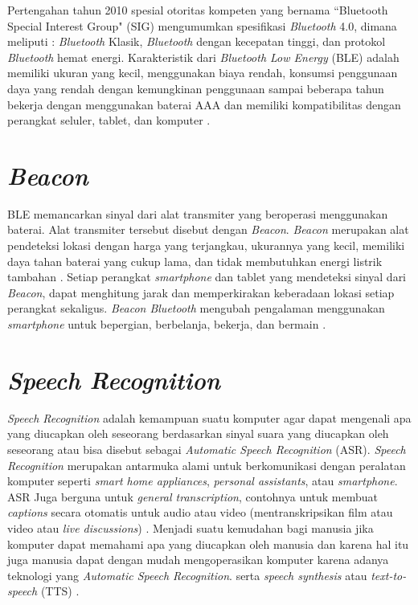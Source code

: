 \par Pertengahan tahun 2010 spesial otoritas kompeten yang bernama “Bluetooth Special Interest Group" (SIG) mengumumkan spesifikasi \textit{Bluetooth} 4.0, dimana meliputi : \textit{Bluetooth} Klasik, \textit{Bluetooth} dengan kecepatan tinggi, dan protokol \textit{Bluetooth} hemat energi. Karakteristik dari \textit{Bluetooth Low Energy} (BLE) adalah memiliki ukuran yang kecil, menggunakan biaya rendah, konsumsi penggunaan daya yang rendah dengan kemungkinan penggunaan sampai beberapa tahun bekerja dengan menggunakan baterai AAA dan memiliki kompatibilitas dengan perangkat seluler, tablet, dan komputer \citep{kaluvza2017analysis}.



\section{\textit{Beacon}}
BLE memancarkan sinyal dari alat transmiter yang beroperasi menggunakan baterai. Alat transmiter tersebut disebut dengan \textit{Beacon}. \textit{Beacon} merupakan alat pendeteksi lokasi dengan harga yang terjangkau, ukurannya yang kecil, memiliki daya tahan baterai yang cukup lama, dan tidak membutuhkan energi listrik tambahan \citep{puspitasari2020}. Setiap perangkat \textit{smartphone} dan tablet yang mendeteksi sinyal dari \textit{Beacon}, dapat menghitung jarak dan memperkirakan keberadaan lokasi setiap perangkat sekaligus. \textit{Beacon Bluetooth} mengubah pengalaman menggunakan \textit{smartphone} untuk bepergian, berbelanja, bekerja, dan bermain \citep{kaluvza2017analysis}.

\section{\textit{Speech Recognition}}
\textit{Speech Recognition} adalah kemampuan suatu komputer agar dapat mengenali apa yang diucapkan oleh seseorang berdasarkan sinyal suara yang diucapkan oleh seseorang atau bisa disebut sebagai \textit{Automatic Speech Recognition} (ASR)\citep{jurafskyspeech2008}. \textit{Speech Recognition} merupakan antarmuka alami untuk berkomunikasi dengan peralatan komputer seperti \textit{smart home appliances}, \textit{personal assistants}, atau \textit{smartphone}. ASR Juga berguna untuk \textit{general transcription}, contohnya untuk membuat \textit{captions} secara otomatis untuk audio atau video (mentranskripsikan film atau video atau \textit{live discussions}) \citep{jurafskyspeech2008}. Menjadi suatu kemudahan bagi manusia jika komputer dapat memahami apa yang diucapkan oleh manusia dan karena hal itu juga manusia dapat dengan mudah mengoperasikan komputer karena adanya teknologi yang \textit{Automatic Speech Recognition}. serta \textit{speech synthesis} atau \textit{text-to-speech} (TTS) \citep{jurafskyspeech2008}.

